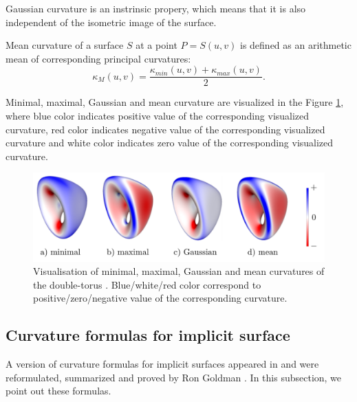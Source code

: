 Gaussian curvature is an
instrinsic propery, which means that it is also independent of the isometric image of the surface.

\begin{definition}
    Mean curvature of a surface $S$ at a point $P=S(u,v)$ is defined as an
    arithmetic mean of corresponding principal curvatures:
    $$\kappa_M(u, v) = \frac{\kappa_{min}(u,v) + \kappa_{max}(u,v)}{2}.$$
\end{definition}

Minimal, maximal, Gaussian and mean curvature are visualized in the Figure \ref{img:16},
where blue color indicates positive value of the corresponding visualized curvature,
red color indicates negative value of the corresponding visualized curvature
and white color indicates zero value of the corresponding visualized curvature.

\begin{figure}
    \centerline{\includegraphics[scale=0.5]{images/img16}}
    \caption[Visualisation of the curvatures of the double-torus]
    {Visualisation of minimal, maximal, Gaussian and mean curvatures of the double-torus \cite{novello2021differential}.
    Blue/white/red color correspond to positive/zero/negative value of the corresponding curvature.}
    \label{img:16}
\end{figure}

\subsection{Curvature formulas for implicit surface}

A version of curvature formulas for implicit surfaces appeared in \cite{spivak1975comprehensive}
and were reformulated, summarized and proved by Ron Goldman \cite{goldman2005curvature}.
In this subsection, we point out these formulas.

